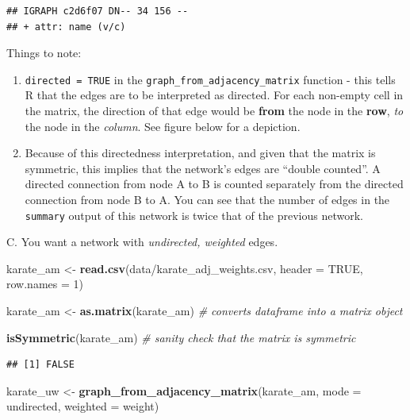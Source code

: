 \documentclass[
]{book}
\newenvironment{Shaded}{\begin{snugshade}}{\end{snugshade}}
\newcommand{\AttributeTok}[1]{\textcolor[rgb]{0.13,0.29,0.53}{#1}}
\newcommand{\CommentTok}[1]{\textcolor[rgb]{0.56,0.35,0.01}{\textit{#1}}}
\newcommand{\ConstantTok}[1]{\textcolor[rgb]{0.56,0.35,0.01}{#1}}
\newcommand{\DecValTok}[1]{\textcolor[rgb]{0.00,0.00,0.81}{#1}}
\newcommand{\FunctionTok}[1]{\textcolor[rgb]{0.13,0.29,0.53}{\textbf{#1}}}
\newcommand{\NormalTok}[1]{#1}
\newcommand{\OtherTok}[1]{\textcolor[rgb]{0.56,0.35,0.01}{#1}}
\newcommand{\StringTok}[1]{\textcolor[rgb]{0.31,0.60,0.02}{#1}}
\providecommand{\tightlist}{%
  \setlength{\itemsep}{0pt}\setlength{\parskip}{0pt}}
\begin{document}
\begin{verbatim}
## IGRAPH c2d6f07 DN-- 34 156 -- 
## + attr: name (v/c)
\end{verbatim}

Things to note:

\begin{enumerate}
\def\labelenumi{\arabic{enumi}.}
\tightlist
\item
  \texttt{directed\ =\ TRUE} in the \texttt{graph\_from\_adjacency\_matrix} function - this tells R that the edges are to be interpreted as directed. For each non-empty cell in the matrix, the direction of that edge would be \textbf{from} the node in the \textbf{row}, \emph{to} the node in the \emph{column}. See figure below for a depiction.
\item
  Because of this directedness interpretation, and given that the matrix is symmetric, this implies that the network's edges are ``double counted''. A directed connection from node A to B is counted separately from the directed connection from node B to A. You can see that the number of edges in the \texttt{summary} output of this network is twice that of the previous network.
\end{enumerate}

C. You want a network with \emph{undirected, weighted} edges.

\begin{Shaded}
\begin{Highlighting}[]
\NormalTok{karate\_am }\OtherTok{\textless{}{-}} \FunctionTok{read.csv}\NormalTok{(}\StringTok{\textquotesingle{}data/karate\_adj\_weights.csv\textquotesingle{}}\NormalTok{, }\AttributeTok{header =} \ConstantTok{TRUE}\NormalTok{, }\AttributeTok{row.names =} \DecValTok{1}\NormalTok{)}

\NormalTok{karate\_am }\OtherTok{\textless{}{-}} \FunctionTok{as.matrix}\NormalTok{(karate\_am) }\CommentTok{\# converts dataframe into a matrix object}

\FunctionTok{isSymmetric}\NormalTok{(karate\_am) }\CommentTok{\# sanity check that the matrix is symmetric }
\end{Highlighting}
\end{Shaded}

\begin{verbatim}
## [1] FALSE
\end{verbatim}

\begin{Shaded}
\begin{Highlighting}[]
\NormalTok{karate\_uw }\OtherTok{\textless{}{-}} \FunctionTok{graph\_from\_adjacency\_matrix}\NormalTok{(karate\_am, }\AttributeTok{mode =} \StringTok{\textquotesingle{}undirected\textquotesingle{}}\NormalTok{, }\AttributeTok{weighted =} \StringTok{\textquotesingle{}weight\textquotesingle{}}\NormalTok{)}
\end{Highlighting}
\end{Shaded}
\end{document}
